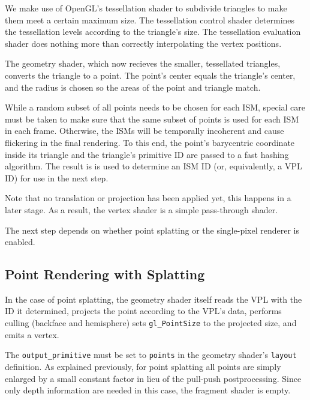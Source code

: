 We make use of OpenGL's tessellation shader to subdivide triangles to make them meet a certain maximum size. The tessellation control shader determines the tessellation levels according to the triangle's size. The tessellation evaluation shader does nothing more than correctly interpolating the vertex positions.

The geometry shader, which now recieves the smaller, tessellated triangles, converts the triangle to a point. The point's center equals the triangle's center, and the radius is chosen so the areas of the point and triangle match.


While a random subset of all points needs to be chosen for each ISM, special care must be taken to make sure that the same subset of points is used for each ISM in each frame. Otherwise, the ISMs will be temporally incoherent and cause flickering in the final rendering. To this end, the point's barycentric coordinate inside its triangle and the triangle's primitive ID are passed to a fast hashing algorithm. The result is is used to determine an ISM ID (or, equivalently, a VPL ID) for use in the next step.

Note that no translation or projection has been applied yet, this happens in a later stage. As a result, the vertex shader is a simple pass-through shader.

The next step depends on whether point splatting or the single-pixel renderer is enabled.



\subsection{Point Rendering with Splatting}

In the case of point splatting, the geometry shader itself reads the VPL with the ID it determined, projects the point according to the VPL's data, performs culling (backface and hemisphere) sets \texttt{gl\_PointSize} to the projected size, and emits a vertex.

The \texttt{output\_primitive} must be set to \texttt{points} in the geometry shader's \texttt{layout} definition. As explained previously, for point splatting all points are simply enlarged by a small constant factor in lieu of the pull-push postprocessing. Since only depth information are needed in this case, the fragment shader is empty.




